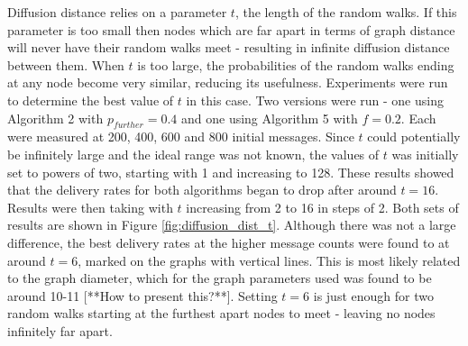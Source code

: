 \documentclass[bsc,frontabs,twoside,singlespacing,parskip,deptreport]{infthesis}     %
\begin{document}
Diffusion distance relies on a parameter $t$, the length of the random walks. If this parameter is too small then nodes which are far apart in terms of graph distance will never have their random walks meet - resulting in infinite diffusion distance between them. When $t$ is too large, the probabilities of the random walks ending at any node become very similar, reducing its usefulness. Experiments were run to determine the best value of $t$ in this case. Two versions were run - one using Algorithm 2 with $p_{further}=0.4$ and one using Algorithm 5 with $f=0.2$. Each were measured at 200, 400, 600 and 800 initial messages. Since $t$ could potentially be infinitely large and the ideal range was not known, the values of $t$ was initially set to powers of two, starting with 1 and increasing to 128. These results showed that the delivery rates for both algorithms began to drop after around $t=16$. Results were then taking with $t$ increasing from 2 to 16 in steps of 2. Both sets of results are shown in Figure \ref{fig:diffusion_dist_t}. Although there was not a large difference, the best delivery rates at the higher message counts were found to at around $t=6$, marked on the graphs with vertical lines. This is most likely related to the graph diameter, which for the graph parameters used was found to be around 10-11 [**How to present this?**]. Setting $t=6$ is just enough for two random walks starting at the furthest apart nodes to meet - leaving no nodes infinitely far apart.
\end{document}
